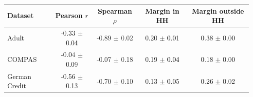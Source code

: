 \begin{tabular}{lcccc}
\hline
Dataset & Pearson $r$ & Spearman $\rho$ & Margin in HH & Margin outside HH  \\
\hline
Adult & -0.33 $\pm$ 0.04 & -0.89 $\pm$ 0.02 & 0.20 $\pm$ 0.01 & 0.38 $\pm$ 0.00 \\
COMPAS & -0.04 $\pm$ 0.09 & -0.07 $\pm$ 0.18 & 0.19 $\pm$ 0.04 & 0.18 $\pm$ 0.00 \\
German Credit & -0.56 $\pm$ 0.13 & -0.70 $\pm$ 0.10 & 0.13 $\pm$ 0.05 & 0.26 $\pm$ 0.02 \\
\hline
\end{tabular}